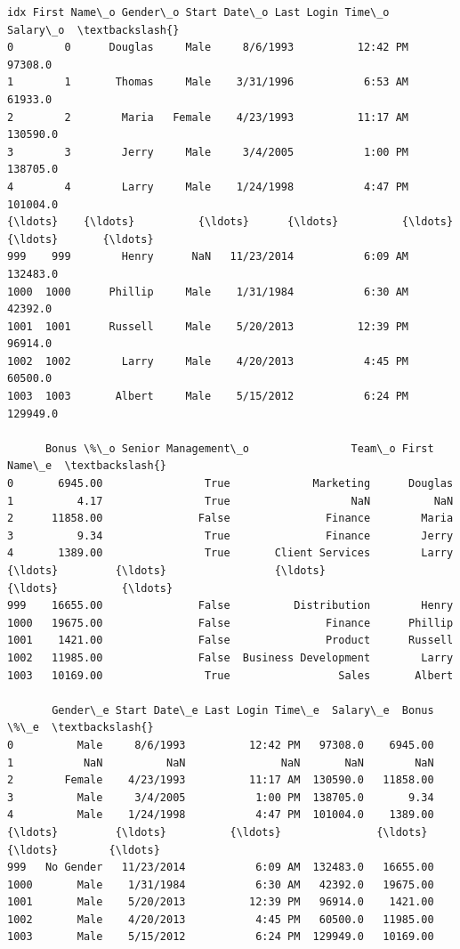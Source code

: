 \documentclass [oneside,10pt,a4paper,ngerman,BCOR10mm,headsepline,parindent,final]{scrartcl}
\makeatletter
\newcommand{\boxspacing}{\kern\kvtcb@left@rule\kern\kvtcb@boxsep}
\newcommand{\prompt}[4]{
        {\ttfamily\llap{{\color{#2}[#3]:\hspace{3pt}#4}}\vspace{-\baselineskip}}
    }
\makeatother
\begin{document}
            \begin{tcolorbox}[breakable, size=fbox, boxrule=.5pt, pad at break*=1mm, opacityfill=0]
\prompt{Out}{outcolor}{27}{\boxspacing}
\begin{Verbatim}[commandchars=\\\{\}]
       idx First Name\_o Gender\_o Start Date\_o Last Login Time\_o  Salary\_o  \textbackslash{}
0        0      Douglas     Male     8/6/1993          12:42 PM   97308.0
1        1       Thomas     Male    3/31/1996           6:53 AM   61933.0
2        2        Maria   Female    4/23/1993          11:17 AM  130590.0
3        3        Jerry     Male     3/4/2005           1:00 PM  138705.0
4        4        Larry     Male    1/24/1998           4:47 PM  101004.0
{\ldots}    {\ldots}          {\ldots}      {\ldots}          {\ldots}               {\ldots}       {\ldots}
999    999        Henry      NaN   11/23/2014           6:09 AM  132483.0
1000  1000      Phillip     Male    1/31/1984           6:30 AM   42392.0
1001  1001      Russell     Male    5/20/2013          12:39 PM   96914.0
1002  1002        Larry     Male    4/20/2013           4:45 PM   60500.0
1003  1003       Albert     Male    5/15/2012           6:24 PM  129949.0

      Bonus \%\_o Senior Management\_o                Team\_o First Name\_e  \textbackslash{}
0       6945.00                True             Marketing      Douglas
1          4.17                True                   NaN          NaN
2      11858.00               False               Finance        Maria
3          9.34                True               Finance        Jerry
4       1389.00                True       Client Services        Larry
{\ldots}         {\ldots}                 {\ldots}                   {\ldots}          {\ldots}
999    16655.00               False          Distribution        Henry
1000   19675.00               False               Finance      Phillip
1001    1421.00               False               Product      Russell
1002   11985.00               False  Business Development        Larry
1003   10169.00                True                 Sales       Albert

       Gender\_e Start Date\_e Last Login Time\_e  Salary\_e  Bonus \%\_e  \textbackslash{}
0          Male     8/6/1993          12:42 PM   97308.0    6945.00
1           NaN          NaN               NaN       NaN        NaN
2        Female    4/23/1993          11:17 AM  130590.0   11858.00
3          Male     3/4/2005           1:00 PM  138705.0       9.34
4          Male    1/24/1998           4:47 PM  101004.0    1389.00
{\ldots}         {\ldots}          {\ldots}               {\ldots}       {\ldots}        {\ldots}
999   No Gender   11/23/2014           6:09 AM  132483.0   16655.00
1000       Male    1/31/1984           6:30 AM   42392.0   19675.00
1001       Male    5/20/2013          12:39 PM   96914.0    1421.00
1002       Male    4/20/2013           4:45 PM   60500.0   11985.00
1003       Male    5/15/2012           6:24 PM  129949.0   10169.00


\end{Verbatim}
\end{tcolorbox}
\end{document}
